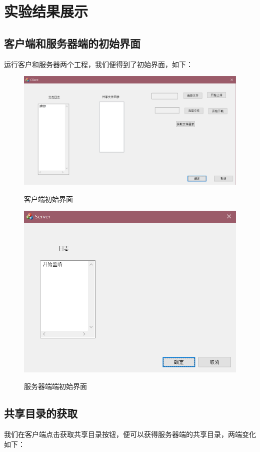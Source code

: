 \section{实验结果展示}
\subsection{客户端和服务器端的初始界面}
运行客户和服务器两个工程，我们便得到了初始界面，如下：
\begin{figure}[H]
  \centering
  \includegraphics[width=0.8\linewidth]{figure/client_init}\\
  \caption{客户端初始界面}
\end{figure}

\begin{figure}[H]
  \centering
  \includegraphics[width=0.8\linewidth]{figure/server_init}\\
  \caption{服务器端端初始界面}
\end{figure}

\subsection{共享目录的获取}
我们在客户端点击获取共享目录按钮，便可以获得服务器端的共享目录，两端变化如下：


